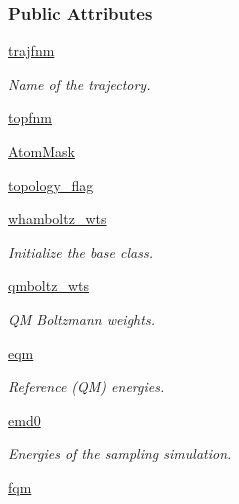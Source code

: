 \subsubsection*{\-Public \-Attributes}
\begin{DoxyCompactItemize}
\item 
\hyperlink{classforcebalance_1_1gmxio_1_1AbInitio__GMX_a03444ffaa9a007c19a14062eba187375}{trajfnm}
\begin{DoxyCompactList}\small\item\em \-Name of the trajectory. \end{DoxyCompactList}\item 
\hyperlink{classforcebalance_1_1gmxio_1_1AbInitio__GMX_ac86e5eeee4ed51aad1bb70c186ab69f6}{topfnm}
\item 
\hyperlink{classforcebalance_1_1gmxio_1_1AbInitio__GMX_abd8d6bf2f0b8287a77bfbf055b84371e}{\-Atom\-Mask}
\item 
\hyperlink{classforcebalance_1_1gmxio_1_1AbInitio__GMX_aed68d5926a58dd23476835caaa5722b3}{topology\-\_\-flag}
\item 
\hyperlink{classforcebalance_1_1abinitio_1_1AbInitio_ae5c60f421336c2ecb716be16b8d51fdf}{whamboltz\-\_\-wts}
\begin{DoxyCompactList}\small\item\em \-Initialize the base class. \end{DoxyCompactList}\item 
\hyperlink{classforcebalance_1_1abinitio_1_1AbInitio_a5d7019720cce40eb336b82b5d0c74f87}{qmboltz\-\_\-wts}
\begin{DoxyCompactList}\small\item\em \-Q\-M \-Boltzmann weights. \end{DoxyCompactList}\item 
\hyperlink{classforcebalance_1_1abinitio_1_1AbInitio_a621b8b2fb62435de36c6895ba6ea09aa}{eqm}
\begin{DoxyCompactList}\small\item\em \-Reference (\-Q\-M) energies. \end{DoxyCompactList}\item 
\hyperlink{classforcebalance_1_1abinitio_1_1AbInitio_a975f07dd65ff96266fbd9fe2d9683ab3}{emd0}
\begin{DoxyCompactList}\small\item\em \-Energies of the sampling simulation. \end{DoxyCompactList}\item 
\hyperlink{classforcebalance_1_1abinitio_1_1AbInitio_a6b773c8a8a0134fdb4773eff6b23a4b9}{fqm}

\end{DoxyCompactItemize}
